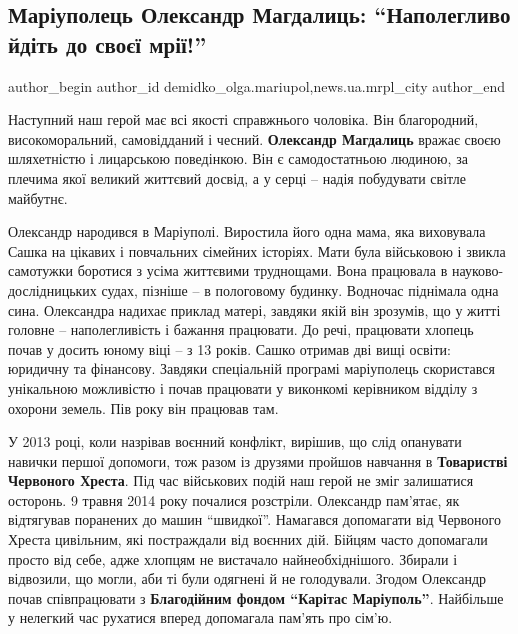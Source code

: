  
 
 
 
 
 
\subsection{Маріуполець Олександр Магдалиць: \enquote{Наполегливо йдіть до своєї мрії!}}
\label{sec:15_10_2019.stz.news.ua.mrpl_city.1.oleksandr_magdalyc}
 
\ifcmt
 author_begin
   author_id demidko_olga.mariupol,news.ua.mrpl_city
 author_end
\fi


Наступний наш герой має всі якості справжнього чоловіка. Він благородний,
високоморальний, самовідданий і чесний. \textbf{Олександр Магдалиць} вражає своєю
шляхетністю і лицарською поведінкою. Він є самодостатньою людиною, за плечима
якої великий життєвий досвід, а у серці – надія побудувати світле майбутнє.

Олександр народився в Маріуполі. Виростила його одна мама, яка виховувала Сашка
на цікавих і повчальних сімейних історіях. Мати була військовою і звикла
самотужки боротися з усіма життєвими труднощами. Вона працювала в
науково-дослідницьких судах, пізніше – в пологовому будинку. Водночас піднімала
одна сина. Олександра надихає приклад матері, завдяки якій він зрозумів, що у
житті головне – наполегливість і бажання працювати. До речі, працювати хлопець
почав у досить юному віці – з 13 років. Сашко отримав дві вищі освіти: юридичну
та фінансову. Завдяки спеціальній програмі маріуполець скористався унікальною
можливістю і почав працювати у виконкомі керівником відділу з охорони земель.
Пів року він працював там.


У 2013 році, коли назрівав воєнний конфлікт, вирішив, що слід опанувати навички
першої допомоги, тож разом із друзями пройшов навчання в \textbf{Товаристві Червоного
Хреста}. Під час військових подій наш герой не зміг залишатися осторонь. 9
травня 2014 року почалися розстріли. Олександр пам'ятає, як відтягував
поранених до машин \enquote{швидкої}. Намагався допомагати від Червоного Хреста
цивільним, які постраждали від воєнних дій. Бійцям часто допомагали просто від
себе, адже хлопцям не вистачало найнеобхіднішого. Збирали і відвозили, що
могли, аби ті були одягнені й не голодували. Згодом Олександр почав
співпрацювати з \textbf{Благодійним фондом \enquote{Карітас Маріуполь}}. Найбільше у нелегкий
час рухатися вперед допомагала пам'ять про сім'ю.

